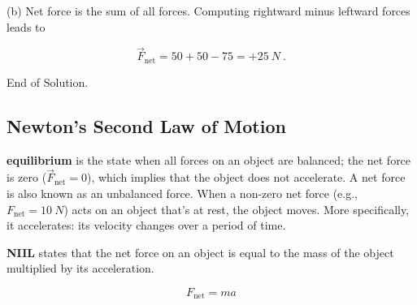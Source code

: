 \documentclass{article}
\begin{document}
\begin{center}
    
\end{center}

(b) Net force is the sum of all forces. Computing rightward minus leftward forces leads to
\vspace{-1em}

\begin{equation*}
    \vec{F}_{\text{net}} = 50 + 50 - 75 = +\SI{25}{N}\ .
\end{equation*}

End of Solution.

\vspace{1em}

\subsection{Newton's Second Law of Motion} \label{kkBUgj}

\textbf{equilibrium} is the state when all forces on an object are balanced; the net force is zero ($\vec{F}_{\text{net}} = 0$), which implies that the object does not accelerate. A net force is also known as an unbalanced force. When a non-zero net force (e.g., $F_{\text{net}} = \SI{10}{N}$) acts on an object that's at rest, the object moves. More specifically, it accelerates: its velocity changes over a period of time.


\textbf{NIIL} states that the net force on an object is equal to the mass of the object multiplied by its acceleration.

\begin{equation} \label{eq:NewtonIILaw} 
    F_{\mathrm{net}} = ma
\end{equation}
\end{document}
